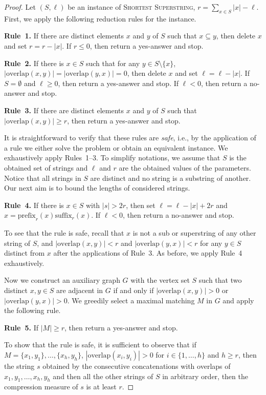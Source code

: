 \documentclass[11pt]{article}
\newcommand{\prefix}{\textrm{prefix}}
\newcommand{\suffix}{\textrm{suffix}}
\newcommand{\overlap}{\textrm{overlap}}
\begin{document}
\begin{proof}
Let $(S,\ell)$ be an instance of \textsc{Shortest Superstring}, $r=\sum_{x\in S}|x|-\ell$. First, we apply the following reduction rules for the instance.

\medskip
\noindent
{\bf Rule~1.} If there are distinct elements $x$ and $y$ of $S$ such that $x\subseteq y$, then delete $x$ and set $r=r-|x|$. If $r\leq 0$, then return a yes-answer and stop.


\medskip
\noindent
{\bf Rule~2.} If there is $x\in S$ such that for any $y\in S\setminus\{x\}$, $|\overlap(x,y)|=|\overlap(y,x)|=0$, then delete $x$ and set $\ell=\ell-|x|$. 
If $S=\emptyset$ and $\ell\geq 0$, then return a yes-answer and stop. If $\ell<0$, then return a no-answer and stop.


\medskip
\noindent
{\bf Rule~3.} If there are distinct elements  $x$ and $y$ of $S$ such that $|\overlap(x,y)|\geq r$, then return a yes-answer and stop. 

\medskip
It is straightforward to verify that these rules are \emph{safe}, i.e., by the application of a rule we either solve the problem or obtain an equivalent instance.
We exhaustively apply Rules~1--3. To simplify notations, we assume that $S$ is the obtained set of strings and $\ell$ and $r$ are the obtained values of the parameters.
Notice that all strings in $S$ are distinct and no string is a substring of another.
Our next aim is to bound the lengths of considered strings.

\medskip
\noindent
{\bf Rule~4.} If there is $x\in S$ with $|s|>2r$, then set $\ell=\ell-|x|+2r$ and $x=\prefix_r(x)\suffix_r(x)$. If $\ell<0$, then return a no-answer and stop.

\medskip
To see that the rule is safe, recall that $x$ is not a sub or superstring of any other string of $S$, and $|\overlap(x,y)|<r$ and $|\overlap(y,x)|<r$ for any $y\in S$ distinct from $x$ after the applications of Rule~3. As before, we apply Rule~4 exhaustively. 

Now we construct an auxiliary graph $G$ with the vertex set $S$ such that two distinct $x,y\in S$ are adjacent in $G$ if and only if $|\overlap(x,y)|>0$ or $|\overlap(y,x)|>0$. 
We greedily select a maximal matching $M$ in $G$ and apply the following rule.

\medskip
\noindent
{\bf Rule~5.} If $|M|\geq r$, then return a yes-answer and stop. 

\medskip
To show that the rule is safe, it is sufficient to observe that if $M=\{x_1,y_1\},\ldots,\{x_h,y_h\}$, $|\overlap(x_i,y_i)|>0$ for $i\in\{1,\ldots,h\}$ and $h\geq r$, then the string $s$ obtained by the consecutive concatenations with overlaps of   $x_1,y_1,\ldots,x_h,y_h$ and then all the other strings of $S$ in arbitrary order, then the compression measure of $s$ is at least $r$. 


\end{proof}
\end{document}
